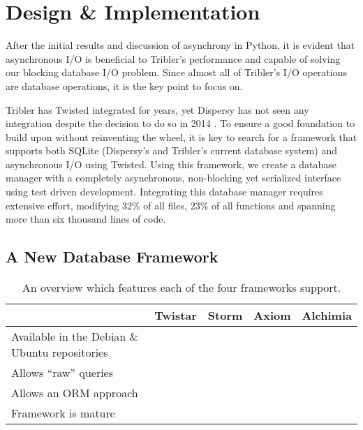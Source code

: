 \chapter{Design \& Implementation}
\label{cpt:design_implementation}

After the initial results and discussion of asynchrony in Python, it is evident that asynchronous I/O is beneficial to Tribler's performance and capable of solving our blocking database I/O problem.
Since almost all of Tribler's I/O operations are database operations, it is the key point to focus on.

Tribler has Twisted integrated for years, yet Dispersy has not seen any integration despite the decision to do so in 2014 \cite{pouwelse2013consider}.
To ensure a good foundation to build upon without reinventing the wheel, it is key to search for a framework that supports both SQLite (Dispersy's and Tribler's current database system) and asynchronous I/O using Twisted.
Using this framework, we create a database manager with a completely asynchronous, non-blocking yet serialized interface using test driven development.
Integrating this database manager requires extensive effort, modifying 32\% of all files, 23\% of all functions and spanning more than six thousand lines of code.

\section{A New Database Framework}

\begin{table}[]
	\centering
	\caption{An overview which features each of the four frameworks support.}
	\label{table:database_frameworks_comparison}
	\begin{tabular}{l|c|c|c|c|}
		\cline{2-5}
		& \textbf{Twistar} & \textbf{Storm} & \textbf{Axiom} & \textbf{Alchimia} \\ \hline
	\multicolumn{1}{|p{4cm}|}{Available in the Debian \& Ubuntu repositories} 	& \xmark & \cmark & \cmark & \xmark \\ \hline
	\multicolumn{1}{|l|}{Allows \enquote{raw} queries} 							& \cmark & \cmark & \cmark & \cmark \\ \hline
	\multicolumn{1}{|l|}{Allows an ORM approach} 								& \cmark & \cmark & \cmark & \xmark \\ \hline
	\multicolumn{1}{|l|}{Framework is mature} 									& \cmark & \cmark & \cmark & \xmark \\ \hline
	\end{tabular}
\end{table}

